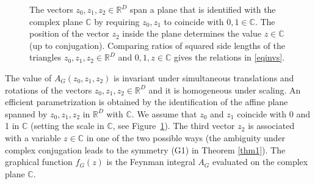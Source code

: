 \documentclass[oneside]{amsart}
\newcommand{\CC}{{\mathbb C}}
\newcommand{\RR}{{\mathbb R}}
\theoremstyle{plain}
\begin{document}
\begin{figure}
\begin{center}
\end{center}
\caption{The vectors $z_0,z_1,z_2\in\RR^D$ span a plane that is identified with the complex plane $\CC$ by requiring $z_0,z_1$ to coincide with $0,1\in \CC$.
The position of the vector $z_2$ inside the plane determines the value $z\in\CC$ (up to conjugation). Comparing ratios of squared side lengths of the triangles $z_0,z_1,z_2 \in \RR^D$
and $0,1,z \in \CC$ gives the relations in \eqref{eqinvs}.}
\label{fig:Ctriangle}
\end{figure}

The value of $A_G(z_0,z_1,z_2)$ is invariant under simultaneous translations and rotations of the vectors $z_0,z_1,z_2 \in \RR^D$ and it is homogeneous under scaling.
An efficient parametrization is obtained by the identification of the affine plane spanned by $z_0,z_1,z_2$ in $\RR^D$ with $\CC$.
We assume that $z_0$ and $z_1$ coincide with 0 and 1 in $\CC$ (setting the scale in $\CC$, see Figure~\ref{fig:Ctriangle}).
The third vector $z_2$ is associated with a variable $z\in\CC$ in one of the two possible ways (the ambiguity under complex conjugation leads to the symmetry (G1) in Theorem \ref{thm1}).
The graphical function $f_G(z)$ is the Feynman integral $A_G$ evaluated on the complex plane $\CC$.
\end{document}
